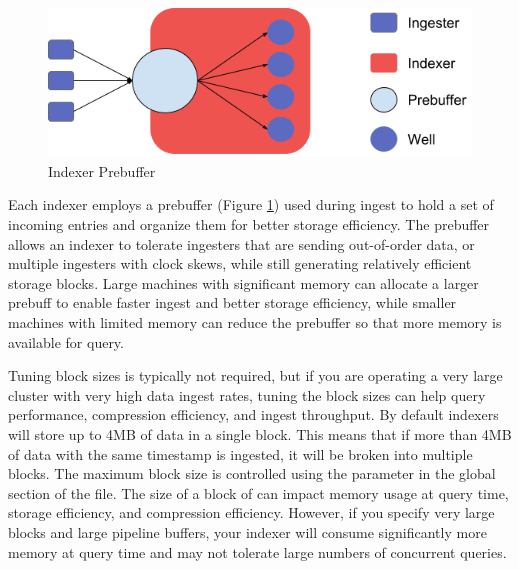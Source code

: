 \begin{figure}
	\includegraphics{images/prebuffer.png}
	\caption{Indexer Prebuffer}
	\label{fig:prebuffer}
\end{figure}

Each indexer employs a prebuffer (Figure \ref{fig:prebuffer}) used during ingest to hold a set of
incoming entries and organize them for better storage efficiency. The
prebuffer allows an indexer to tolerate ingesters that are sending
out-of-order data, or multiple ingesters with clock skews, while still
generating relatively efficient storage blocks. Large machines with
significant memory can allocate a larger prebuff to enable faster
ingest and better storage efficiency, while smaller machines with
limited memory can reduce the prebuffer so that more memory is available
for query.

Tuning block sizes is typically not required, but if you are operating
a very large cluster with very high data ingest rates, tuning the block
sizes can help query performance, compression efficiency, and ingest
throughput. By default indexers will store up to 4MB of data in a
single block. This means that if more than 4MB of data with the same
timestamp is ingested, it will be broken into multiple blocks. The
maximum block size is controlled using the  parameter
in the global section of the  file. The size of a
block of can impact memory usage at query time, storage efficiency, and
compression efficiency. However, if you specify very large blocks and
large pipeline buffers, your indexer will consume significantly more
memory at query time and may not tolerate large numbers of concurrent
queries.

